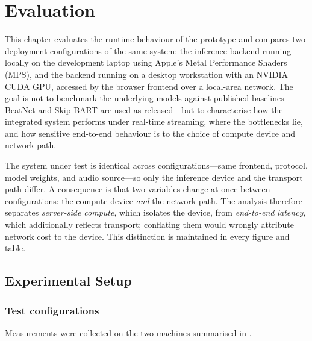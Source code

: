 \chapter{Evaluation}
\label{chap:evaluation}

This chapter evaluates the runtime behaviour of the prototype and compares two deployment configurations of the same system: the inference backend running locally on the development laptop using Apple's Metal Performance Shaders (MPS), and the backend running on a desktop workstation with an NVIDIA CUDA GPU, accessed by the browser frontend over a local-area network. The goal is not to benchmark the underlying models against published baselines---BeatNet and Skip-BART are used as released---but to characterise how the integrated system performs under real-time streaming, where the bottlenecks lie, and how sensitive end-to-end behaviour is to the choice of compute device and network path.

The system under test is identical across configurations---same frontend, protocol, model weights, and audio source---so only the inference device and the transport path differ. A consequence is that two variables change at once between configurations: the compute device \emph{and} the network path. The analysis therefore separates \emph{server-side compute}, which isolates the device, from \emph{end-to-end latency}, which additionally reflects transport; conflating them would wrongly attribute network cost to the device. This distinction is maintained in every figure and table.

\section{Experimental Setup}
\label{sec:eval-setup}

\subsection{Test configurations}

Measurements were collected on the two machines summarised in .

